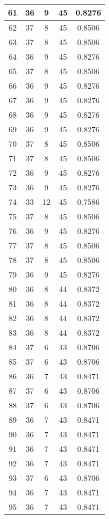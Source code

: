\documentclass[letterpaper, 12pt]{article}
\begin{document}
\begin{longtable}{|c|c|c|c|c|}
\hline
61 & 36 & 9 & 45 & 0.8276 \\
\hline
62 & 37 & 8 & 45 & 0.8506 \\
\hline
63 & 37 & 8 & 45 & 0.8506 \\
\hline
64 & 36 & 9 & 45 & 0.8276 \\
\hline
65 & 37 & 8 & 45 & 0.8506 \\
\hline
66 & 36 & 9 & 45 & 0.8276 \\
\hline
67 & 36 & 9 & 45 & 0.8276 \\
\hline
68 & 36 & 9 & 45 & 0.8276 \\
\hline
69 & 36 & 9 & 45 & 0.8276 \\
\hline
70 & 37 & 8 & 45 & 0.8506 \\
\hline
71 & 37 & 8 & 45 & 0.8506 \\
\hline
72 & 36 & 9 & 45 & 0.8276 \\
\hline
73 & 36 & 9 & 45 & 0.8276 \\
\hline
74 & 33 & 12 & 45 & 0.7586 \\
\hline
75 & 37 & 8 & 45 & 0.8506 \\
\hline
76 & 36 & 9 & 45 & 0.8276 \\
\hline
77 & 37 & 8 & 45 & 0.8506 \\
\hline
78 & 37 & 8 & 45 & 0.8506 \\
\hline
79 & 36 & 9 & 45 & 0.8276 \\
\hline
80 & 36 & 8 & 44 & 0.8372 \\
\hline
81 & 36 & 8 & 44 & 0.8372 \\
\hline
82 & 36 & 8 & 44 & 0.8372 \\
\hline
83 & 36 & 8 & 44 & 0.8372 \\
\hline
84 & 37 & 6 & 43 & 0.8706 \\
\hline
85 & 37 & 6 & 43 & 0.8706 \\
\hline
86 & 36 & 7 & 43 & 0.8471 \\
\hline
87 & 37 & 6 & 43 & 0.8706 \\
\hline
88 & 37 & 6 & 43 & 0.8706 \\
\hline
89 & 36 & 7 & 43 & 0.8471 \\
\hline
90 & 36 & 7 & 43 & 0.8471 \\
\hline
91 & 36 & 7 & 43 & 0.8471 \\
\hline
92 & 36 & 7 & 43 & 0.8471 \\
\hline
93 & 37 & 6 & 43 & 0.8706 \\
\hline
94 & 36 & 7 & 43 & 0.8471 \\
\hline
95 & 36 & 7 & 43 & 0.8471 \\

\end{longtable}
\end{document}
